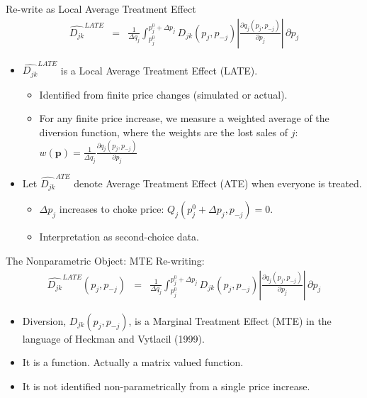 \documentclass[xcolor=pdftex,dvipsnames,table,mathserif,aspectratio=169]{beamer}
\begin{document}
\begin{frame}{Re-write as Local Average Treatment Effect}
\begin{eqnarray*}
\widehat{D_{jk} }^{LATE}&=& \frac{1}{\Delta q_j} \int_{p_j^{0}}^{p_j^{0}+\Delta p_j} D_{jk}(p_j,p_{-j}) \left| \frac{\partial q_j (p_j,p_{-j})}{\partial p_j} \right|\, \partial p_j
\end{eqnarray*}
\begin{itemize}
\item $\widehat{D_{jk}}^{LATE}$ is a Local Average Treatment Effect \alert{(LATE)}.
\begin{itemize}
\item Identified from finite price changes (simulated or actual).
\item For any finite price increase, we measure a weighted average of the diversion function, where the weights are the lost sales of $j$:  $w(\mathbf{p}) = \frac{1}{\Delta q_j} \frac{\partial q_j(p_j,p_{-j})}{\partial p_j} $
\end{itemize}
\pause
\item Let $\widehat{D_{jk}}^{ATE}$ denote Average Treatment Effect \alert{(ATE)} when everyone is treated.
 \begin{itemize}
\item $\Delta p_j$ increases to \alert{choke price}:  $Q_j(p_j^0 + \Delta p_j, p_{-j}) = 0$.
\item Interpretation as second-choice data.
\end{itemize}
\end{itemize}
\end{frame}



\begin{frame}{The Nonparametric Object: MTE}
Re-writing:
\begin{eqnarray*}
\widehat{D_{jk}}^{LATE}(p_j,p_{-j})&=& \frac{1}{\Delta q_j} \int_{p_j^{0}}^{p_j^{0}+\Delta p_j} D_{jk}(p_j,p_{-j}) \left| \frac{\partial q_j (p_j,p_{-j})}{\partial p_j} \right|\, \partial p_j
\end{eqnarray*}
\begin{itemize}
\item Diversion, $D_{jk}(p_j,p_{-j})$, is a Marginal Treatment Effect \alert{(MTE)}  in the language of Heckman and Vytlacil (1999).
\item It is a \alert{function}. Actually a \alert{matrix valued function}.
\item It is not identified non-parametrically from a single price increase.
\end{itemize}
\end{frame}
\end{document}

